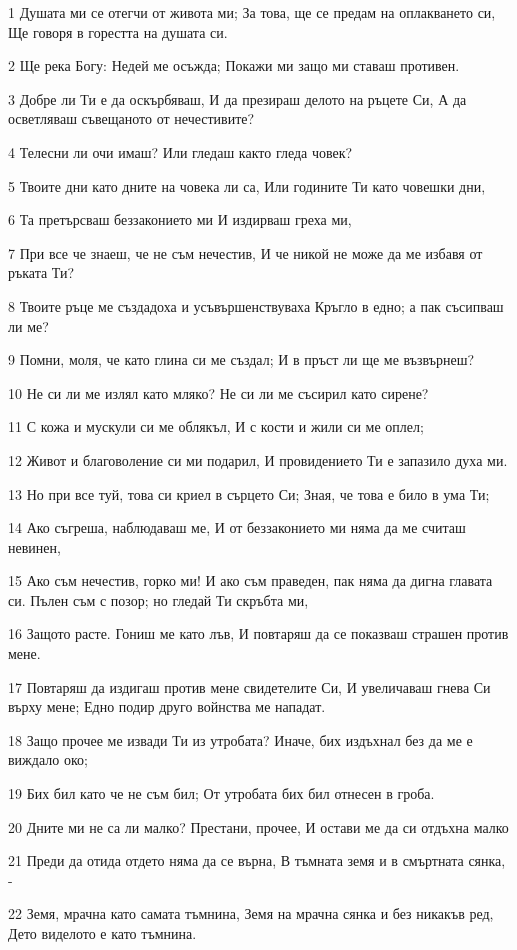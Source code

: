 \par 1 Душата ми се отегчи от живота ми; За това, ще се предам на оплакването си, Ще говоря в горестта на душата си.
\par 2 Ще река Богу: Недей ме осъжда; Покажи ми защо ми ставаш противен.
\par 3 Добре ли Ти е да оскърбяваш, И да презираш делото на ръцете Си, А да осветляваш съвещаното от нечестивите?
\par 4 Телесни ли очи имаш? Или гледаш както гледа човек?
\par 5 Твоите дни като дните на човека ли са, Или годините Ти като човешки дни,
\par 6 Та претърсваш беззаконието ми И издирваш греха ми,
\par 7 При все че знаеш, че не съм нечестив, И че никой не може да ме избавя от ръката Ти?
\par 8 Твоите ръце ме създадоха и усъвършенствуваха Кръгло в едно; а пак съсипваш ли ме?
\par 9 Помни, моля, че като глина си ме създал; И в пръст ли ще ме възвърнеш?
\par 10 Не си ли ме излял като мляко? Не си ли ме съсирил като сирене?
\par 11 С кожа и мускули си ме облякъл, И с кости и жили си ме оплел;
\par 12 Живот и благоволение си ми подарил, И провидението Ти е запазило духа ми.
\par 13 Но при все туй, това си криел в сърцето Си; Зная, че това е било в ума Ти;
\par 14 Ако съгреша, наблюдаваш ме, И от беззаконието ми няма да ме считаш невинен,
\par 15 Ако съм нечестив, горко ми! И ако съм праведен, пак няма да дигна главата си. Пълен съм с позор; но гледай Ти скръбта ми,
\par 16 Защото расте. Гониш ме като лъв, И повтаряш да се показваш страшен против мене.
\par 17 Повтаряш да издигаш против мене свидетелите Си, И увеличаваш гнева Си върху мене; Едно подир друго войнства ме нападат.
\par 18 Защо прочее ме извади Ти из утробата? Иначе, бих издъхнал без да ме е виждало око;
\par 19 Бих бил като че не съм бил; От утробата бих бил отнесен в гроба.
\par 20 Дните ми не са ли малко? Престани, прочее, И остави ме да си отдъхна малко
\par 21 Преди да отида отдето няма да се върна, В тъмната земя и в смъртната сянка, -
\par 22 Земя, мрачна като самата тъмнина, Земя на мрачна сянка и без никакъв ред, Дето виделото е като тъмнина.

